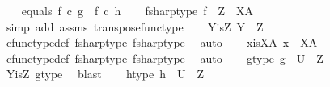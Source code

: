 \begin{isabellebody}
\ \ \isamarkupfalse%
\ equals{\isacharcolon}{\kern0pt}\ {\isachardoublequoteopen}f\isactrlsup {\isasymsharp}\ {\isasymcirc}\isactrlsub c\ g\ {\isacharequal}{\kern0pt}\ f\isactrlsup {\isasymsharp}\ {\isasymcirc}\isactrlsub c\ h{\isachardoublequoteclose}\isanewline
\isanewline
\ \ \isamarkupfalse%
\ f{\isacharunderscore}{\kern0pt}sharp{\isacharunderscore}{\kern0pt}type{}{\isacharcolon}{\kern0pt}\ {\isachardoublequoteopen}f\isactrlsup {\isasymsharp}\ {\isacharcolon}{\kern0pt}\ Z\ {\isasymrightarrow}\ X\isactrlbsup A\isactrlesup {\isachardoublequoteclose}\isanewline
\ \ \ \ \isamarkupfalse%
\ {\isacharparenleft}{\kern0pt}simp\ add{\isacharcolon}{\kern0pt}\ assms{\isacharparenleft}{\kern0pt}{}{\isacharparenright}{\kern0pt}\ transpose{\isacharunderscore}{\kern0pt}func{\isacharunderscore}{\kern0pt}type{\isacharparenright}{\kern0pt}\isanewline
\ \ \isamarkupfalse%
\ Y{\isacharunderscore}{\kern0pt}is{\isacharunderscore}{\kern0pt}Z{\isacharcolon}{\kern0pt}\ {\isachardoublequoteopen}Y\ {\isacharequal}{\kern0pt}\ Z{\isachardoublequoteclose}\isanewline
\ \ \ \ \isamarkupfalse%
\ cfunc{\isacharunderscore}{\kern0pt}type{\isacharunderscore}{\kern0pt}def\ f{\isacharunderscore}{\kern0pt}sharp{\isacharunderscore}{\kern0pt}type\ f{\isacharunderscore}{\kern0pt}sharp{\isacharunderscore}{\kern0pt}type{}\ \isamarkupfalse%
\ auto\isanewline
\ \ \isamarkupfalse%
\ x{\isacharunderscore}{\kern0pt}is{\isacharunderscore}{\kern0pt}XA{\isacharcolon}{\kern0pt}\ {\isachardoublequoteopen}x\ {\isacharequal}{\kern0pt}\ X\isactrlbsup A\isactrlesup {\isachardoublequoteclose}\isanewline
\ \ \ \ \isamarkupfalse%
\ cfunc{\isacharunderscore}{\kern0pt}type{\isacharunderscore}{\kern0pt}def\ f{\isacharunderscore}{\kern0pt}sharp{\isacharunderscore}{\kern0pt}type\ f{\isacharunderscore}{\kern0pt}sharp{\isacharunderscore}{\kern0pt}type{}\ \isamarkupfalse%
\ auto\isanewline
\ \ \isamarkupfalse%
\ g{\isacharunderscore}{\kern0pt}type{}{\isacharcolon}{\kern0pt}\ {\isachardoublequoteopen}g\ {\isacharcolon}{\kern0pt}\ U\ {\isasymrightarrow}\ Z{\isachardoublequoteclose}\isanewline
\ \ \ \ \isamarkupfalse%
\ Y{\isacharunderscore}{\kern0pt}is{\isacharunderscore}{\kern0pt}Z\ g{\isacharunderscore}{\kern0pt}type\ \isamarkupfalse%
\ blast\isanewline
\ \ \isamarkupfalse%
\ h{\isacharunderscore}{\kern0pt}type{}{\isacharcolon}{\kern0pt}\ {\isachardoublequoteopen}h\ {\isacharcolon}{\kern0pt}\ U\ {\isasymrightarrow}\ Z{\isachardoublequoteclose}\isanewline

\end{isabellebody}
